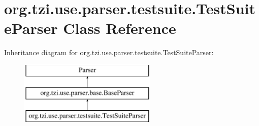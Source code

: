 \hypertarget{classorg_1_1tzi_1_1use_1_1parser_1_1testsuite_1_1_test_suite_parser}{\section{org.\-tzi.\-use.\-parser.\-testsuite.\-Test\-Suite\-Parser Class Reference}
\label{classorg_1_1tzi_1_1use_1_1parser_1_1testsuite_1_1_test_suite_parser}
}
Inheritance diagram for org.\-tzi.\-use.\-parser.\-testsuite.\-Test\-Suite\-Parser\-:\begin{figure}[H]
\begin{center}
\leavevmode
\includegraphics[height=3.000000cm]{classorg_1_1tzi_1_1use_1_1parser_1_1testsuite_1_1_test_suite_parser}
\end{center}
\end{figure}
